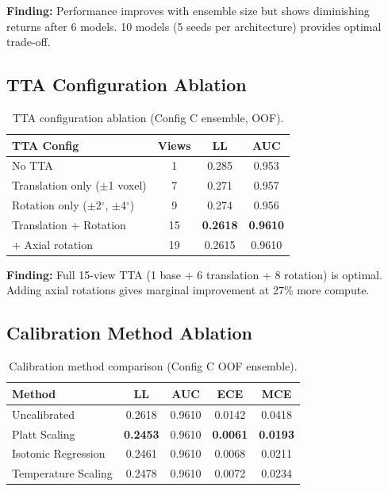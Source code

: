 \textbf{Finding:} Performance improves with ensemble size but shows diminishing returns after 6 models. 10 models (5 seeds per architecture) provides optimal trade-off.

\subsection{TTA Configuration Ablation}
\label{sec:tta_ablation}

\begin{table}[H]
\centering
\caption{TTA configuration ablation (Config C ensemble, OOF).}
\label{tab:tta_ablation}
\begin{tabular}{lccc}
\toprule
\textbf{TTA Config} & \textbf{Views} & \textbf{LL} & \textbf{AUC} \\
\midrule
No TTA & 1 & 0.285 & 0.953 \\
Translation only ($\pm$1 voxel) & 7 & 0.271 & 0.957 \\
Rotation only ($\pm$2$^\circ$, $\pm$4$^\circ$) & 9 & 0.274 & 0.956 \\
Translation + Rotation & 15 & \textbf{0.2618} & \textbf{0.9610} \\
+ Axial rotation & 19 & 0.2615 & 0.9610 \\
\bottomrule
\end{tabular}
\end{table}

\textbf{Finding:} Full 15-view TTA (1 base + 6 translation + 8 rotation) is optimal. Adding axial rotations gives marginal improvement at 27\% more compute.

\subsection{Calibration Method Ablation}
\label{sec:cal_ablation}

\begin{table}[H]
\centering
\caption{Calibration method comparison (Config C OOF ensemble).}
\label{tab:cal_ablation}
\begin{tabular}{lcccc}
\toprule
\textbf{Method} & \textbf{LL} & \textbf{AUC} & \textbf{ECE} & \textbf{MCE} \\
\midrule
Uncalibrated & 0.2618 & 0.9610 & 0.0142 & 0.0418 \\
Platt Scaling & \textbf{0.2453} & 0.9610 & \textbf{0.0061} & \textbf{0.0193} \\
Isotonic Regression & 0.2461 & 0.9610 & 0.0068 & 0.0211 \\
Temperature Scaling & 0.2478 & 0.9610 & 0.0072 & 0.0234 \\
\bottomrule
\end{tabular}
\end{table}


